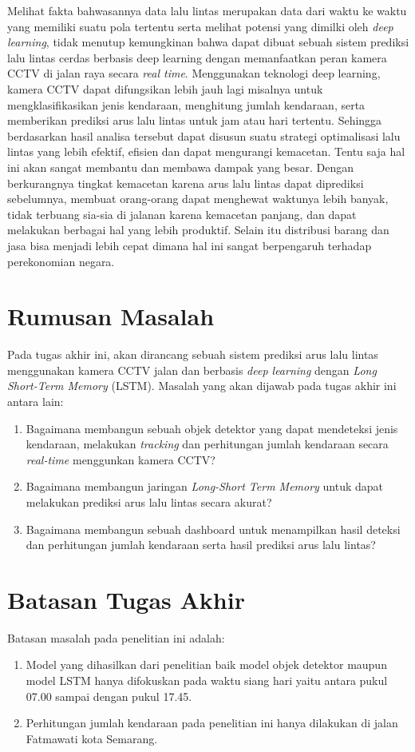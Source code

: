 \documentclass[../thesis.tex]{subfiles}
\begin{document}
Melihat fakta bahwasannya data lalu lintas merupakan data dari waktu ke waktu yang memiliki suatu pola tertentu serta melihat potensi yang dimilki oleh \textit{deep learning}, tidak menutup kemungkinan bahwa dapat dibuat sebuah sistem prediksi lalu lintas cerdas berbasis deep learning dengan memanfaatkan peran kamera CCTV di jalan raya secara \textit{real time}. 
Menggunakan teknologi deep learning, kamera CCTV dapat difungsikan lebih jauh lagi misalnya untuk mengklasifikasikan jenis kendaraan, menghitung jumlah kendaraan, serta memberikan prediksi arus lalu lintas untuk jam atau hari tertentu. Sehingga berdasarkan hasil analisa tersebut dapat disusun suatu strategi optimalisasi lalu lintas yang lebih efektif, efisien dan dapat mengurangi kemacetan. 
Tentu saja hal ini akan sangat membantu dan membawa dampak yang besar. Dengan berkurangnya tingkat kemacetan karena arus lalu lintas dapat diprediksi sebelumnya, membuat orang-orang dapat menghewat waktunya lebih banyak, tidak terbuang sia-sia di jalanan karena kemacetan panjang, dan dapat melakukan berbagai hal yang lebih produktif. 
Selain itu distribusi barang dan jasa bisa menjadi lebih cepat dimana hal ini sangat berpengaruh terhadap perekonomian negara. 

\section{Rumusan Masalah}

Pada tugas akhir ini, akan dirancang sebuah sistem prediksi arus lalu lintas menggunakan kamera CCTV jalan dan berbasis \textit{deep learning} dengan \textit{Long Short-Term Memory} (LSTM). Masalah yang akan dijawab pada tugas akhir ini antara lain:
\begin{enumerate}
\item Bagaimana membangun sebuah objek detektor yang dapat mendeteksi jenis kendaraan, melakukan \textit{tracking} dan perhitungan jumlah kendaraan secara \textit{real-time} menggunkan kamera CCTV?
\item Bagaimana membangun jaringan \textit{Long-Short Term Memory} untuk dapat melakukan prediksi arus lalu lintas secara akurat?
\item Bagaimana membangun sebuah dashboard untuk menampilkan hasil deteksi dan perhitungan jumlah kendaraan serta hasil prediksi arus lalu lintas?
\end{enumerate}

\section{Batasan Tugas Akhir}
Batasan masalah pada penelitian ini adalah:
\begin{enumerate}
    \item Model yang dihasilkan dari penelitian baik model objek detektor maupun model LSTM hanya difokuskan pada waktu siang hari yaitu antara pukul 07.00 sampai dengan pukul 17.45.
    \item Perhitungan jumlah kendaraan pada penelitian ini hanya dilakukan di jalan Fatmawati kota Semarang.
\end{enumerate}
\end{document}
